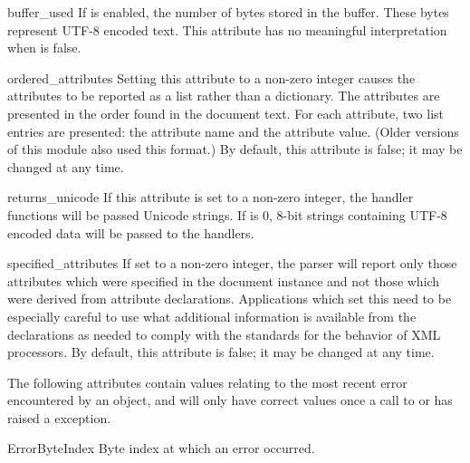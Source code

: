 \begin{memberdesc}[xmlparser]{buffer_used}
If  is enabled, the number of bytes stored in the
buffer.  These bytes represent UTF-8 encoded text.  This attribute has
no meaningful interpretation when  is false.
\end{memberdesc}

\begin{memberdesc}[xmlparser]{ordered_attributes}
Setting this attribute to a non-zero integer causes the attributes to
be reported as a list rather than a dictionary.  The attributes are
presented in the order found in the document text.  For each
attribute, two list entries are presented: the attribute name and the
attribute value.  (Older versions of this module also used this
format.)  By default, this attribute is false; it may be changed at
any time.
\end{memberdesc}

\begin{memberdesc}[xmlparser]{returns_unicode} 
If this attribute is set to a non-zero integer, the handler functions
will be passed Unicode strings.  If  is 0,
8-bit strings containing UTF-8 encoded data will be passed to the
handlers.
\end{memberdesc}

\begin{memberdesc}[xmlparser]{specified_attributes}
If set to a non-zero integer, the parser will report only those
attributes which were specified in the document instance and not those
which were derived from attribute declarations.  Applications which
set this need to be especially careful to use what additional
information is available from the declarations as needed to comply
with the standards for the behavior of XML processors.  By default,
this attribute is false; it may be changed at any time.
\end{memberdesc}

The following attributes contain values relating to the most recent
error encountered by an  object, and will only have
correct values once a call to  or 
has raised a  exception.

\begin{memberdesc}[xmlparser]{ErrorByteIndex} 
Byte index at which an error occurred.
\end{memberdesc} 

